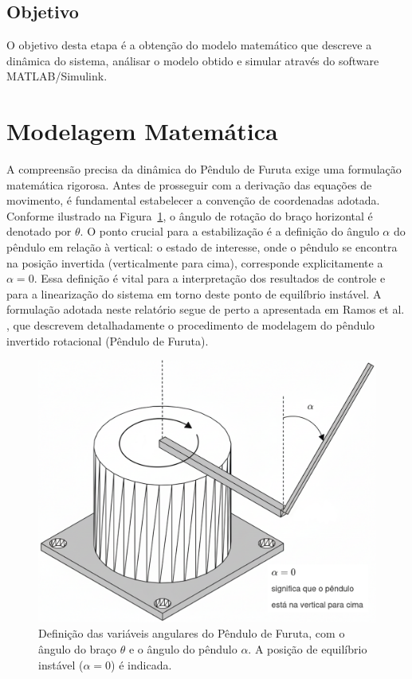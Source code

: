 \documentclass[9pt,a4paper,twocolumn,twoside]{tau-class/tau}
\begin{document}
\subsection{Objetivo}
O objetivo desta etapa é a obtenção do modelo matemático que descreve a dinâmica do sistema, 
análisar o modelo obtido e simular através do software MATLAB/Simulink.

\section{Modelagem Matemática}

A compreensão precisa da dinâmica do Pêndulo de Furuta exige uma formulação matemática rigorosa. Antes de prosseguir com a derivação das equações de movimento, é fundamental estabelecer a convenção de coordenadas adotada. Conforme ilustrado na Figura~\ref{fig:angulo_pendulo}, o ângulo de rotação do braço horizontal é denotado por \(\theta\). O ponto crucial para a estabilização é a definição do ângulo \(\alpha\) do pêndulo em relação à vertical: o estado de interesse, onde o pêndulo se encontra na posição invertida (verticalmente para cima), corresponde explicitamente a \(\alpha = 0\). Essa definição é vital para a interpretação dos resultados de controle e para a linearização do sistema em torno deste ponto de equilíbrio instável.
A formulação adotada neste relatório segue de perto a apresentada em Ramos et al. \cite{ramos2011rotary}, 
que descrevem detalhadamente o procedimento de modelagem do pêndulo invertido rotacional (Pêndulo de Furuta). 
\begin{figure}[H]
    \centering
    \includegraphics[width=0.9\columnwidth]{figures/angulo_pendulo.png} %
    \caption{Definição das variáveis angulares do Pêndulo de Furuta, com o ângulo do braço \(\theta\) e o ângulo do pêndulo \(\alpha\). A posição de equilíbrio instável (\(\alpha=0\)) é indicada.}
    \label{fig:angulo_pendulo}
\end{figure}
\end{document}
